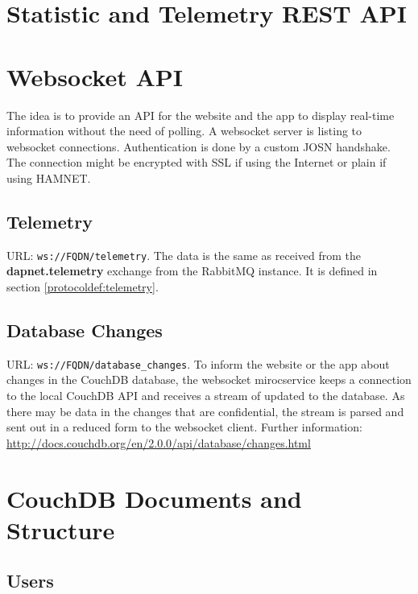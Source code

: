 \section{Statistic and Telemetry REST API}

\section{Websocket API}
\label{protocoldef:websocketapi}
The idea is to provide an API for the website and the app to display real-time information without the need of polling. A websocket server is listing to websocket connections. Authentication is done by a custom JOSN handshake. The connection might be encrypted with SSL if using the Internet or plain if using HAMNET.

\subsection{Telemetry}
\label{protcoldef:websocketapi:telemetry}
URL: \texttt{ws://FQDN/telemetry}.
The data is the same as received from the \textbf{dapnet.telemetry} exchange from the RabbitMQ instance. It is defined in section \ref{protocoldef:telemetry}.

\subsection{Database Changes}
\label{protcoldef:websocketapi:database_changes}
URL: \texttt{ws://FQDN/database_changes}.
To inform the website or the app about changes in the CouchDB database, the websocket mirocservice keeps a connection to the local CouchDB API and receives a stream of updated to the database. As there may be data in the changes that are confidential, the stream is parsed and sent out in a reduced form to the websocket client. Further information: \url{http://docs.couchdb.org/en/2.0.0/api/database/changes.html}

\section{CouchDB Documents and Structure}



\subsection{Users}

